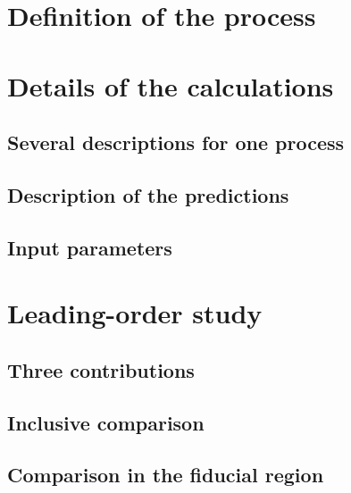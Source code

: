 \documentclass[twocolumn,epjc3]{svjour3} %
\begin{document}


\section{Definition of the process}
\label{sec:definition}



\section{Details of the calculations}
\label{sec:details}

\subsection{Several descriptions for one process}



\subsection{Description of the predictions}



\subsection{Input parameters}
\label{subsec:inputpar}



\section{Leading-order study}
\label{sec:LO}

\subsection{Three contributions}
\label{subsec:contributions}



\subsection{Inclusive comparison}
\label{subsec:LOinclusive}



\subsection{Comparison in the fiducial region}
\label{subsec:LOfiducial}
\end{document}
